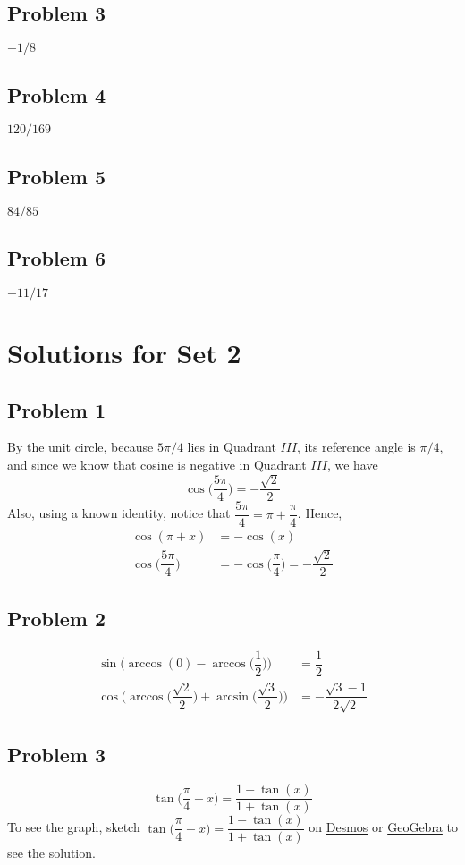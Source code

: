 \documentclass[12pt]{article}
\begin{document}
\subsection*{Problem 3}
\(-1/8\)
\subsection*{Problem 4}
\(120/169\)
\subsection*{Problem 5}
\(84/85\)
\subsection*{Problem 6}
\(-11/17\)
\section*{Solutions for Set 2}
\subsection*{Problem 1}
By the unit circle, because \(5\pi/4\) lies in Quadrant \(III\), its reference angle is \(\pi/4\), and since we know that cosine is negative in Quadrant \(III\), we have
\[\cos\Big(\dfrac{5\pi}{4}\Big)=-\dfrac{\sqrt{2}}{2}\]
Also, using a known identity, notice that \(\dfrac{5\pi}{4}=\pi+\dfrac{\pi}{4}\). Hence,
\begin{align*}
\cos(\pi+x)&=-\cos(x)\\
\cos\Big(\dfrac{5\pi}{4}\Big)&=-\cos\Big(\dfrac{\pi}{4}\Big)=-\dfrac{\sqrt{2}}{2}
\end{align*}
\subsection*{Problem 2}
\begin{align*}
\sin\Big(\arccos(0)-\arccos\Big(\dfrac{1}{2}\Big)\Big)&=\dfrac{1}{2}\\
\cos\Big(\arccos\Big(\dfrac{\sqrt{2}}{2}\Big)+\arcsin\Big(\dfrac{\sqrt{3}}{2}\Big)\Big)&=-\dfrac{\sqrt{3}-1}{2\sqrt{2}}
\end{align*}

\subsection*{Problem 3}
\[\tan\Big(\dfrac{\pi}{4}-x\Big)=\dfrac{1-\tan(x)}{1+\tan(x)}\]
To see the graph, sketch \(\tan\Big(\dfrac{\pi}{4}-x\Big)=\dfrac{1-\tan(x)}{1+\tan(x)}\) on \href{https://www.desmos.com/calculator}{Desmos} or \href{https://www.geogebra.org/graphing?lang=en}{GeoGebra} to see the solution.
\end{document}
